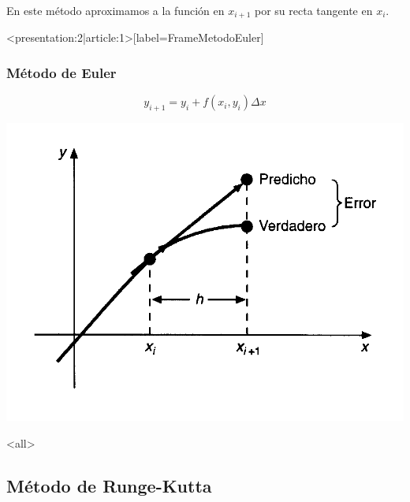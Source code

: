 En este método aproximamos a la función en $x_{i+1}$ por su recta tangente en $x_{i}$. 

\mode*

\begin{frame}<presentation:2|article:1>[label=FrameMetodoEuler]
  \frametitle<presentation>{Método de Euler}
  \center
  \begin{minipage}{0.4\textwidth}
  \begin{equation}
    y_{i+1} = y_i + f(x_i, y_i ) \Delta x
  \end{equation}
  \end{minipage}
  \begin{minipage}{0.4\textwidth}
    \includegraphics[width=\textwidth]{libreoffice/prediccion_Euler.png}
  \end{minipage}
\end{frame}
\mode<all>


\subsection{Método de Runge-Kutta}

